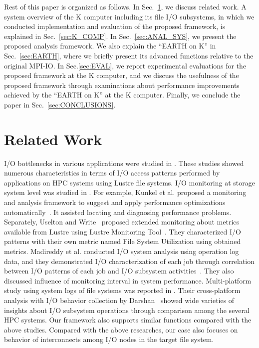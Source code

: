 \documentclass{jhps}
\begin{document}
Rest of this paper is organized as follows.
In Sec.~\ref{sec:RELATED_WORK}, we discuss related work.
A system overview of the K computer including its file I/O subsystems,
in which we conducted implementation and evaluation of the proposed framework,
is explained in Sec.~\ref{sec:K_COMP}.
In Sec.~\ref{sec:ANAL_SYS}, we present the proposed analysis framework.
We also explain the ``EARTH on K'' in Sec.~\ref{sec:EARTH},
where we briefly present its advanced functions relative to the original MPI-IO.
In Sec.\ref{sec:EVAL}, we report experimental evaluations
for the proposed framework at the K computer, and we discuss the usefulness
of the proposed framework through examinations about performance improvements
achieved by the ``EARTH on K'' at the K computer.
Finally, we conclude the paper in Sec.~\ref{sec:CONCLUSIONS}.

\section{Related Work}
\label{sec:RELATED_WORK}

I/O bottlenecks in various applications were studied in \cite{xie:sc12,saini:hipc12}.
These studies showed numerous characteristics in terms of I/O access patterns
performed by applications on HPC systems using Lustre file systems.
I/O monitoring at storage system level was studied
in \cite{isc14:kunkel,uselton:cug13,madireddy:nas17}.
For example, Kunkel et al. proposed a monitoring and analysis framework
to suggest and apply performance optimizations automatically~\cite{isc14:kunkel}.
It assisted locating and diagnosing performance problems.
Separately, Uselton and Write~\cite{uselton:cug13} proposed extended monitoring
about metrics available from Lustre using Lustre Monitoring Tool~\cite{LMT:GitHub}.
They characterized I/O patterns with their own metric named File System Utilization
using obtained metrics.
Madireddy et al. conducted I/O system analysis
using operation log data, and they demonstrated I/O characterization
of each job through correlation between I/O patterns of each job and I/O
subsystem activities~\cite{madireddy:nas17}.
They also discussed influence of monitoring interval in system performance.
Multi-platform study using system logs of file systems was reported
in \cite{luu:HPDC2015}.
Their cross-platform analysis with I/O behavior collection by Darshan~\cite{darshan:web}
showed wide varieties of insights about I/O subsystem operations
through comparison among the several HPC systems.
Our framework also supports similar functions compared with the above studies.
Compared with the above researches, our case also focuses on behavior
of interconnects among I/O nodes in the target file system.
\end{document}
